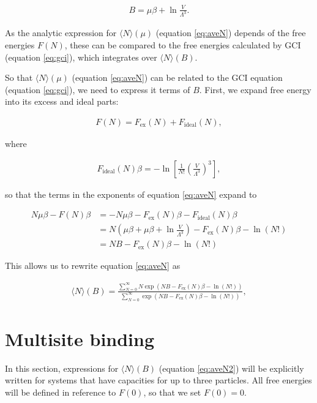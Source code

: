 \documentclass[10pt,a4paper]{article}
\begin{document}
\begin{align}
B = \mu\beta + \ln\frac{V}{\Lambda^3}.
\end{align}

As the analytic expression for $\langle N \rangle(\mu)$ (equation \ref{eq:aveN}) depends of the free energies $F(N)$, these can be compared to the free energies calculated by GCI (equation \ref{eq:gci}), which integrates over $\langle N \rangle(B)$.

So that $\langle N \rangle(\mu)$ (equation \ref{eq:aveN}) can be related to the GCI equation (equation \ref{eq:gci}), we need to express it terms of $B$. First, we expand free energy into its excess and ideal parts:

\begin{align}
F(N) = F_\text{ex}(N) + F_\text{ideal}(N),
\end{align}

where 

\begin{align}
F_\text{ideal}(N)\beta = -\ln\left[\frac{1}{N!}\left(\frac{V}{\Lambda^3}\right)^3\right],
\end{align}

so that the terms in the exponents of equation \ref{eq:aveN} expand to

\begin{align*}
N\mu\beta - F(N)\beta  &= -N\mu\beta -  F_\text{ex}(N)\beta - F_\text{ideal}(N)\beta \\
&= N(\mu\beta + \mu\beta + \ln\frac{V}{\Lambda^3}) - F_\text{ex}(N)\beta  - \ln(N!) \\
&= NB - F_\text{ex}(N)\beta  - \ln(N!)
\end{align*}

This allows us to rewrite equation \ref{eq:aveN} as 

\begin{align}
\langle N \rangle(B) = \frac{\sum_{N=0}^\infty N\exp(NB - F_\text{ex}(N)\beta  - \ln(N!))}{\sum_{N=0}^\infty \exp(NB - F_\text{ex}(N)\beta  - \ln(N!))},
\label{eq:aveN2}
\end{align}



\section{Multisite binding}
In this section, expressions for $\langle N \rangle(B)$ (equation \ref{eq:aveN2}) will be explicitly written for systems that have capacities for up to three particles. All free energies will be defined in reference to $F(0)$, so that we set $F(0)=0$.
\end{document}
